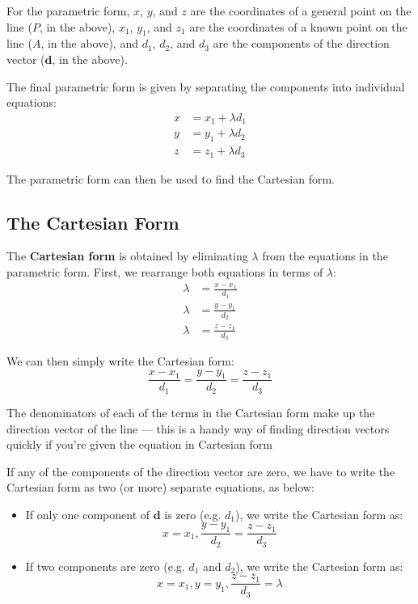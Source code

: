 \documentclass[
	11pt, %
	fleqn, %
	a4paper, %
]{../../styles/LegrandOrangeBook}
\begin{document}
For the parametric form, $x$, $y$, and $z$ are the coordinates of a general point on the line ($P$, in the above), $x_1$, $y_1$, and $z_1$ are the coordinates of a known point on the line ($A$, in the above), and $d_1$, $d_2$, and $d_3$ are the components of the direction vector ($\mathbf{d}$, in the above). 

The final parametric form is given by separating the components into individual equations:
\begin{align*}
    x &= x_1 + \lambda d_1 \\
    y &= y_1 + \lambda d_2 \\
    z &= z_1 + \lambda d_3 
\end{align*}

The parametric form can then be used to find the Cartesian form.

\subsection{The Cartesian Form}

The \textbf{Cartesian form} is obtained by eliminating $\lambda$ from the equations in the parametric form. First, we rearrange both equations in terms of $\lambda$:
\begin{align*}
    \lambda &= \frac{x-x_1}{d_1}\\
    \lambda &= \frac{y-y_1}{d_2} \\
    \lambda &= \frac{z-z_1}{d_3}
\end{align*}

We can then simply write the Cartesian form:
\begin{equation}
    \frac{x-x_1}{d_1} = \frac{y-y_1}{d_2} = \frac{z-z_1}{d_3}
\end{equation}

\begin{remark}
	The denominators of each of the terms in the Cartesian form make up the direction vector of the line — this is a handy way of finding direction vectors quickly if you're given the equation in Cartesian form
\end{remark}

If any of the components of the direction vector are zero, we have to write the Cartesian form as two (or more) separate equations, as below:

\begin{itemize}
	\item If only one component of $\mathbf{d}$ is zero (e.g. $d_1$), we write the Cartesian form as: \begin{equation*}
			x=x_1, \frac{y-y_1}{d_2} = \frac{z-z_1}{d_3}
		\end{equation*}
	\item If two components are zero (e.g. $d_1$ and $d_2$), we write the Cartesian form as:
		\begin{equation*}
			x=x_1, y=y_1, \frac{z-z_1}{d_3} = \lambda
		\end{equation*}
\end{itemize}
\end{document}
